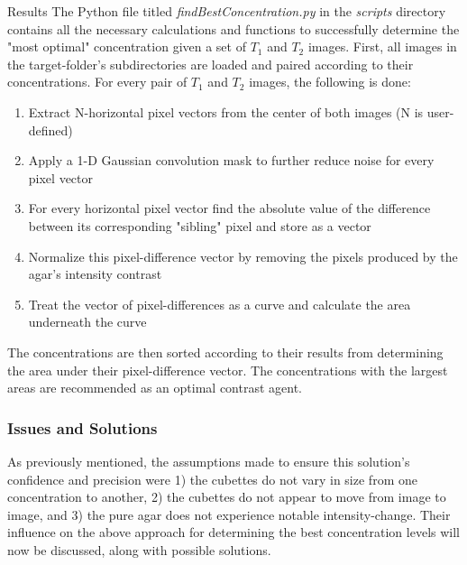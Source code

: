 \documentclass[a4paper,12pt]{article}
\begin{document}
\begin{section}{Results}
The Python file titled {\em findBestConcentration.py} in the {\em scripts} directory contains all the necessary calculations and functions to successfully determine the "most optimal" concentration given a set of $T_1$ and $T_2$ images. First, all images in the target-folder's subdirectories are loaded and paired according to their concentrations. For every pair of $T_1$ and $T_2$ images, the following is done:

\singlespacing
\begin{enumerate}
\item Extract N-horizontal pixel vectors from the center of both images (N is user-defined)
\item Apply a 1-D Gaussian convolution mask to further reduce noise for every pixel vector
\item For every horizontal pixel vector find the absolute value of the difference between its corresponding "sibling" pixel and store as a vector
\item Normalize this pixel-difference vector by removing the pixels produced by the agar's intensity contrast
\item Treat the vector of pixel-differences as a curve and calculate the area underneath the curve
\end{enumerate}

\doublespacing

The concentrations are then sorted according to their results from determining the area under their pixel-difference vector. The concentrations with the largest areas are recommended as an optimal contrast agent.

\subsubsection{Issues and Solutions}

As previously mentioned, the assumptions made to ensure this solution's confidence and precision were 1) the cubettes do not vary in size from one concentration to another, 2) the cubettes do not appear to move from image to image, and 3) the pure agar does not experience notable intensity-change. Their influence on the above approach for determining the best concentration levels will now be discussed, along with possible solutions.


\end{section}
\end{document}
